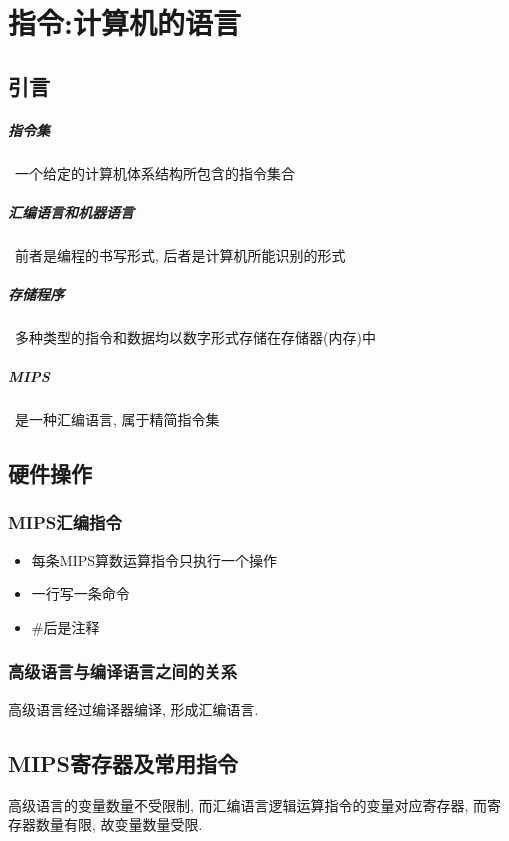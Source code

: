 \chapter{指令:计算机的语言}
\section{引言}
\paragraph{指令集}~{一个给定的计算机体系结构所包含的指令集合} 
\paragraph{汇编语言和机器语言}~{前者是编程的书写形式, 后者是计算机所能识别的形式} 
\paragraph{存储程序}~{多种类型的指令和数据均以数字形式存储在存储器(内存)中}
\paragraph{MIPS}~{是一种汇编语言, 属于精简指令集}
\section{硬件操作}
\subsection{MIPS汇编指令}
\begin{itemize}
\item 每条MIPS算数运算指令只执行一个操作
\item 一行写一条命令
\item \#后是注释
\end{itemize}
\subsection{高级语言与编译语言之间的关系}
高级语言经过编译器编译, 形成汇编语言.
\section{MIPS寄存器及常用指令}
高级语言的变量数量不受限制, 而汇编语言逻辑运算指令的变量对应寄存器, 而寄存器数量有限, 故变量数量受限.

